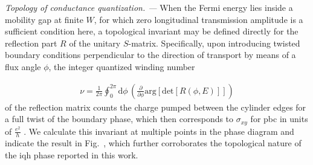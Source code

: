 \documentclass[aps,prb,amsmath,amssymb,twocolumn, superscriptaddress]{revtex4-2}
\begin{document}
{\it Topology of conductance quantization. ---} 
When the Fermi energy lies inside a mobility gap at finite $W$, for which zero longitudinal transmission amplitude is a sufficient condition here, a topological invariant may be defined directly for the reflection part $R$ of the unitary $S$-matrix. Specifically, upon introducing twisted boundary conditions perpendicular to the direction of transport by means of a flux angle $\phi$, the integer quantized winding number 

\begin{align}
\nu = \frac{1}{2\pi} \oint_{0}^{2 \pi} \mathrm{d} \phi\, \left(\frac{\partial}{\partial\phi} \mathrm{arg}[\mathrm{det}[R(\phi, E)]] \right) \label{Eqn:W_num}
\end{align}
of the reflection matrix counts the charge pumped between the cylinder edges for a full twist of the boundary phase, which then corresponds to $\sigma_{xy}$ for \gls{pbc} in units of $\frac{e^2}{h}$ \cite{Smatrix_pumping, Smatrix_pumping_2, Scattering_invariants}. We calculate this invariant at multiple points in the phase diagram and indicate the result in Fig.~, which further corroborates the topological nature of the \gls{iqh} phase reported in this work. 
\end{document}

